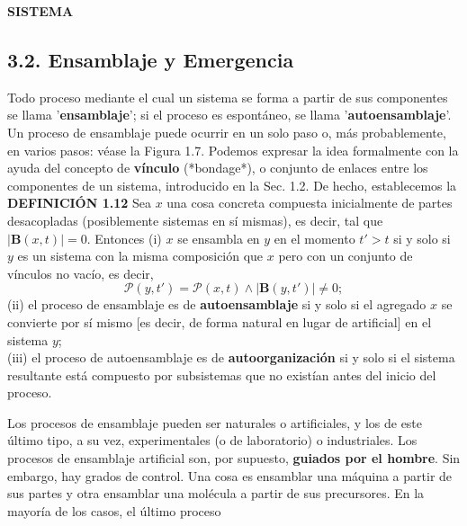 \newpage
\fancyhf{}
\fancyhead[r]{\thepage}
\begin{center}
{\fontsize{13}{16}\selectfont \textbf{SISTEMA}}
\end{center}
\vspace{0.5cm}

{\fontsize{13}{15}\selectfont
\subsection*{3.2. Ensamblaje y Emergencia}
Todo proceso mediante el cual un sistema se forma a partir de sus componentes se llama '\textbf{ensamblaje}'; si el proceso es espontáneo, se llama '\textbf{autoensamblaje}'. Un proceso de ensamblaje puede ocurrir en un solo paso o, más probablemente, en varios pasos: véase la Figura 1.7. Podemos expresar la idea formalmente con la ayuda del concepto de \textbf{vínculo} (*bondage*), o conjunto de enlaces entre los componentes de un sistema, introducido en la Sec. 1.2. De hecho, establecemos la
\\
\textbf{DEFINICIÓN 1.12} Sea $x$ una cosa concreta compuesta inicialmente de partes desacopladas (posiblemente sistemas en sí mismas), es decir, tal que $|\mathbf{B}(x, t)| = 0$. Entonces
(i) $x$ se ensambla en $y$ en el momento $t' > t$ si y solo si $y$ es un sistema con la misma composición que $x$ pero con un conjunto de vínculos no vacío, es decir,
$$ \mathcal{P}(y, t') = \mathcal{P}(x, t) \land |\mathbf{B}(y, t')| \ne 0; $$
(ii) el proceso de ensamblaje es de \textbf{autoensamblaje} si y solo si el agregado $x$ se convierte por sí mismo [es decir, de forma natural en lugar de artificial] en el sistema $y$;
\\
(iii) el proceso de autoensamblaje es de \textbf{autoorganización} si y solo si el sistema resultante está compuesto por subsistemas que no existían antes del inicio del proceso.

Los procesos de ensamblaje pueden ser naturales o artificiales, y los de este último tipo, a su vez, experimentales (o de laboratorio) o industriales. Los procesos de ensamblaje artificial son, por supuesto, \textbf{guiados por el hombre}. Sin embargo, hay grados de control. Una cosa es ensamblar una máquina a partir de sus partes y otra ensamblar una molécula a partir de sus precursores. En la mayoría de los casos, el último proceso
}


